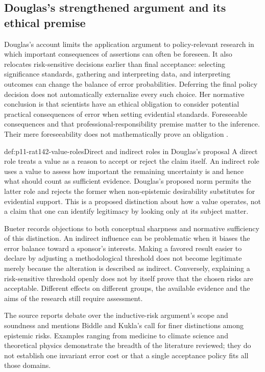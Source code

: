 \subsection{Douglas's strengthened argument and its ethical premise}

Douglas's account limits the application argument to policy-relevant
research in which important consequences of assertions can often be
foreseen. It also relocates risk-sensitive decisions earlier than final
acceptance: selecting significance standards, gathering and interpreting
data, and interpreting outcomes can change the balance of error
probabilities. Deferring the final policy decision does not automatically
externalize every such choice. Her normative conclusion is that scientists
have an ethical obligation to consider potential practical consequences
of error when setting evidential standards. Foreseeable consequences and
that professional-responsibility premise matter to the inference. Their
mere foreseeability does not mathematically prove an obligation
\cite[p.~762]{Bueter2021ValueFreedom}.

\begin{hbdefinition}{def:p11-rat142-value-roles}{Direct and indirect roles in Douglas's proposal}
A direct role treats a value as a reason to accept or reject the claim
itself. An indirect role uses a value to assess how important the remaining
uncertainty is and hence what should count as sufficient evidence.
Douglas's proposed norm permits the latter role and rejects the former
when non-epistemic desirability substitutes for evidential support.
This is a proposed distinction about how a value operates, not a claim
that one can identify legitimacy by looking only at its subject matter.
\end{hbdefinition}

Bueter records objections to both conceptual sharpness and normative
sufficiency of this distinction. An indirect influence can be problematic
when it biases the error balance toward a sponsor's interests. Making a
favored result easier to declare by adjusting a methodological threshold
does not become legitimate merely because the alteration is described
as indirect. Conversely, explaining a risk-sensitive threshold openly
does not by itself prove that the chosen risks are acceptable. Different
effects on different groups, the available evidence and the aims of the
research still require assessment.

The source reports debate over the inductive-risk argument's scope and
soundness and mentions Biddle and Kukla's call for finer distinctions among
epistemic risks. Examples ranging from medicine to climate science and
theoretical physics demonstrate the breadth of the literature reviewed;
they do not establish one invariant error cost or that a single acceptance
policy fits all those domains.

